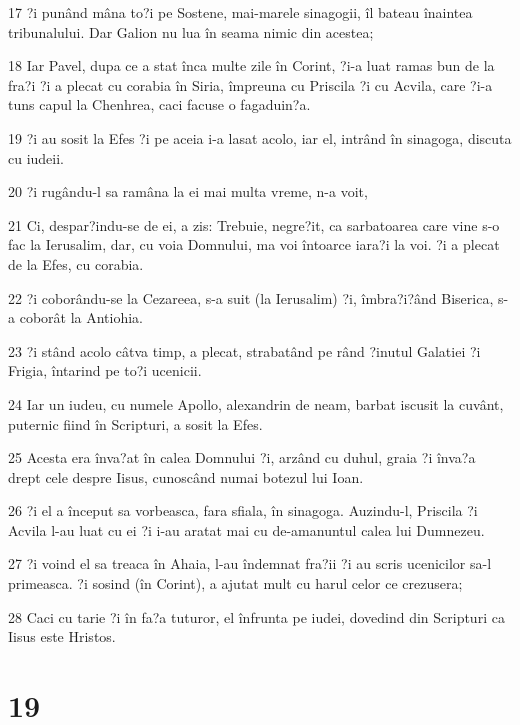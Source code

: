 \par 17 ?i punând mâna to?i pe Sostene, mai-marele sinagogii, îl bateau înaintea tribunalului. Dar Galion nu lua în seama nimic din acestea;
\par 18 Iar Pavel, dupa ce a stat înca multe zile în Corint, ?i-a luat ramas bun de la fra?i ?i a plecat cu corabia în Siria, împreuna cu Priscila ?i cu Acvila, care ?i-a tuns capul la Chenhrea, caci facuse o fagaduin?a.
\par 19 ?i au sosit la Efes ?i pe aceia i-a lasat acolo, iar el, intrând în sinagoga, discuta cu iudeii.
\par 20 ?i rugându-l sa ramâna la ei mai multa vreme, n-a voit,
\par 21 Ci, despar?indu-se de ei, a zis: Trebuie, negre?it, ca sarbatoarea care vine s-o fac la Ierusalim, dar, cu voia Domnului, ma voi întoarce iara?i la voi. ?i a plecat de la Efes, cu corabia.
\par 22 ?i coborându-se la Cezareea, s-a suit (la Ierusalim) ?i, îmbra?i?ând Biserica, s-a coborât la Antiohia.
\par 23 ?i stând acolo câtva timp, a plecat, strabatând pe rând ?inutul Galatiei ?i Frigia, întarind pe to?i ucenicii.
\par 24 Iar un iudeu, cu numele Apollo, alexandrin de neam, barbat iscusit la cuvânt, puternic fiind în Scripturi, a sosit la Efes.
\par 25 Acesta era înva?at în calea Domnului ?i, arzând cu duhul, graia ?i înva?a drept cele despre Iisus, cunoscând numai botezul lui Ioan.
\par 26 ?i el a început sa vorbeasca, fara sfiala, în sinagoga. Auzindu-l, Priscila ?i Acvila l-au luat cu ei ?i i-au aratat mai cu de-amanuntul calea lui Dumnezeu.
\par 27 ?i voind el sa treaca în Ahaia, l-au îndemnat fra?ii ?i au scris ucenicilor sa-l primeasca. ?i sosind (în Corint), a ajutat mult cu harul celor ce crezusera;
\par 28 Caci cu tarie ?i în fa?a tuturor, el înfrunta pe iudei, dovedind din Scripturi ca Iisus este Hristos.

\chapter{19}

